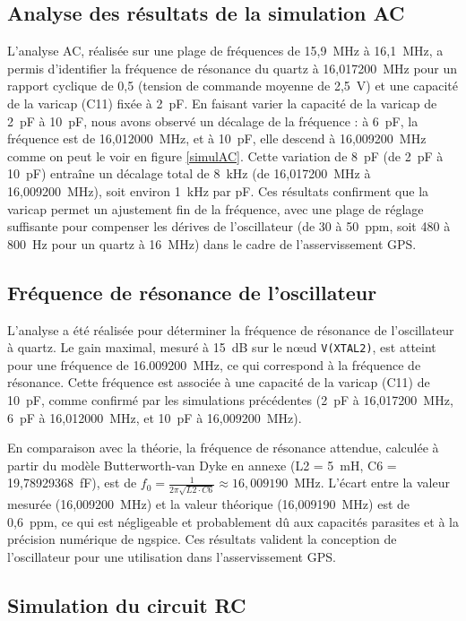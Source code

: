 \documentclass[12pt, a4paper, titlepage]{article}
\begin{document}
\subsection{Analyse des résultats de la simulation AC}

L'analyse AC, réalisée sur une plage de fréquences de 15,9~MHz à 16,1~MHz, a permis d'identifier la fréquence de résonance du quartz à 16,017200~MHz pour un rapport cyclique de 0,5 (tension de commande moyenne de 2,5~V) et une capacité de la varicap (C11) fixée à 2~pF. En faisant varier la capacité de la varicap de 2~pF à 10~pF, nous avons observé un décalage de la fréquence : à 6~pF, la fréquence est de 16,012000~MHz, et à 10~pF, elle descend à 16,009200~MHz comme on peut le voir en figure \ref{simulAC}. Cette variation de 8~pF (de 2~pF à 10~pF) entraîne un décalage total de 8~kHz (de 16,017200~MHz à 16,009200~MHz), soit environ 1~kHz par pF. Ces résultats confirment que la varicap permet un ajustement fin de la fréquence, avec une plage de réglage suffisante pour compenser les dérives de l’oscillateur (de 30 à 50~ppm, soit 480 à 800~Hz pour un quartz à 16~MHz) dans le cadre de l’asservissement GPS.

\subsection{Fréquence de résonance de l’oscillateur}

L'analyse a été réalisée pour déterminer la fréquence de résonance de l’oscillateur à quartz. Le gain maximal, mesuré à 15~dB sur le nœud \texttt{V(XTAL2)}, est atteint pour une fréquence de  \SI{16,009200}{\mega\hertz}, ce qui correspond à la fréquence de résonance. Cette fréquence est associée à une capacité de la varicap (C11) de 10~pF, comme confirmé par les simulations précédentes (2~pF à 16,017200~MHz, 6~pF à 16,012000~MHz, et 10~pF à 16,009200~MHz).

En comparaison avec la théorie, la fréquence de résonance attendue, calculée à partir du modèle Butterworth-van Dyke en annexe \cite{Butterworth} (L2 = 5~mH, C6 = 19,78929368~fF), est de $f_0 = \frac{1}{2\pi \sqrt{L2 \cdot C6}} \approx 16,009190$~MHz. L’écart entre la valeur mesurée (16,009200~MHz) et la valeur théorique (16,009190~MHz) est de 0,6~ppm, ce qui est négligeable et probablement dû aux capacités parasites et à la précision numérique de ngspice. Ces résultats valident la conception de l’oscillateur pour une utilisation dans l’asservissement GPS.

\subsection{Simulation du circuit RC}
\end{document}

